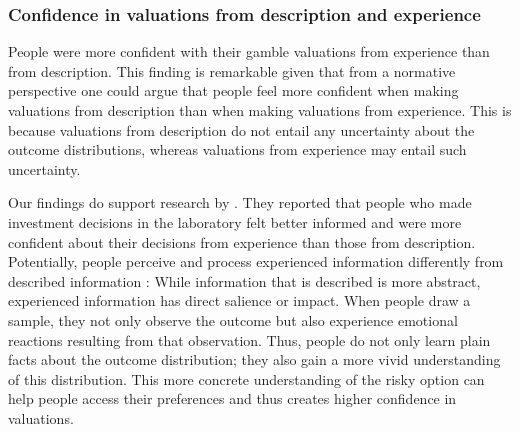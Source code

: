 \documentclass[a4paper, man, natbib, floatsintext]{apa6}
\begin{document}
\subsubsection{Confidence in valuations from description and experience}
People were more confident with their gamble valuations from experience than from description. This finding is remarkable given that from a normative perspective one could argue that people feel more confident when making valuations from description than when making valuations from experience. This is because valuations from description do not entail any uncertainty about the outcome distributions, whereas valuations from experience may entail such uncertainty.

Our findings do support research by \cite{Bradbury2014}. They reported that people who made investment decisions in the laboratory felt better informed and were more confident about their decisions from experience than those from description.
Potentially, people perceive and process experienced information differently from described information \citep{Kahneman2009}: 
While information that is described is more abstract, experienced information has direct salience or impact. When people draw a sample, they not only observe the outcome but also experience emotional reactions resulting from that observation. Thus, people do not only learn plain facts about the outcome distribution; they also gain a more vivid understanding of this distribution. This more concrete understanding of the risky option can help people access their preferences and thus creates higher confidence in valuations.







\end{document}
